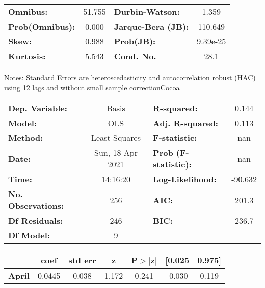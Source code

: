 \begin{center}
\begin{tabular}{lcccccc}
\bottomrule
\end{tabular}
\begin{tabular}{lclc}
\textbf{Omnibus:}       & 51.755 & \textbf{  Durbin-Watson:     } &    1.359  \\
\textbf{Prob(Omnibus):} &  0.000 & \textbf{  Jarque-Bera (JB):  } &  110.649  \\
\textbf{Skew:}          &  0.988 & \textbf{  Prob(JB):          } & 9.39e-25  \\
\textbf{Kurtosis:}      &  5.543 & \textbf{  Cond. No.          } &     28.1  \\
\bottomrule
\end{tabular}
\end{center}

Notes: \newline
 [1] Standard Errors are heteroscedasticity and autocorrelation robust (HAC) using 12 lags and without small sample correctionCocoa\begin{center}
\begin{tabular}{lclc}
\toprule
\textbf{Dep. Variable:}    &      Basis       & \textbf{  R-squared:         } &     0.144   \\
\textbf{Model:}            &       OLS        & \textbf{  Adj. R-squared:    } &     0.113   \\
\textbf{Method:}           &  Least Squares   & \textbf{  F-statistic:       } &       nan   \\
\textbf{Date:}             & Sun, 18 Apr 2021 & \textbf{  Prob (F-statistic):} &      nan    \\
\textbf{Time:}             &     14:16:20     & \textbf{  Log-Likelihood:    } &   -90.632   \\
\textbf{No. Observations:} &         256      & \textbf{  AIC:               } &     201.3   \\
\textbf{Df Residuals:}     &         246      & \textbf{  BIC:               } &     236.7   \\
\textbf{Df Model:}         &           9      & \textbf{                     } &             \\
\bottomrule
\end{tabular}
\begin{tabular}{lcccccc}
                   & \textbf{coef} & \textbf{std err} & \textbf{z} & \textbf{P$> |$z$|$} & \textbf{[0.025} & \textbf{0.975]}  \\
\midrule
\textbf{April}     &       0.0445  &        0.038     &     1.172  &         0.241        &       -0.030    &        0.119     \\

\end{tabular}
\end{center}
